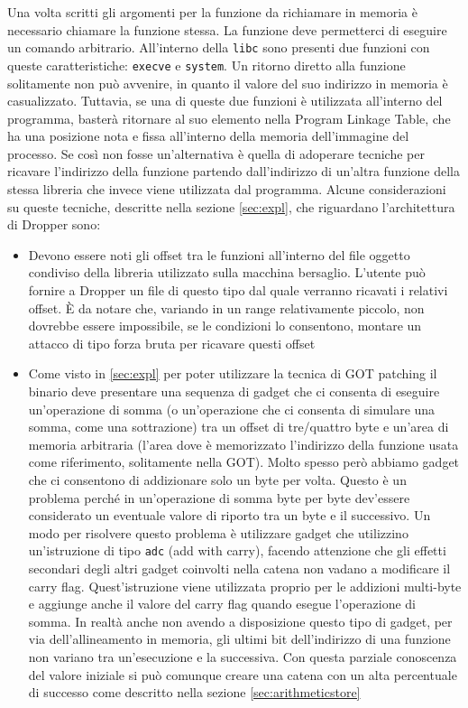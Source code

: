 Una volta scritti gli argomenti per la funzione da richiamare in
memoria è necessario chiamare la funzione stessa. La funzione deve
permetterci di eseguire un comando arbitrario. All'interno della
\lstinline{libc} sono presenti due funzioni con queste
caratteristiche: \lstinline{execve} e \lstinline{system}. Un ritorno
diretto alla funzione solitamente non può avvenire, in quanto il
valore del suo indirizzo in memoria è casualizzato. Tuttavia, se una
di queste due funzioni è utilizzata all'interno del programma, basterà
ritornare al suo elemento nella Program Linkage Table, che ha una
posizione nota e fissa all'interno della memoria dell'immagine del
processo. Se così non fosse un'alternativa è quella di adoperare
tecniche per ricavare l'indirizzo della funzione partendo
dall'indirizzo di un'altra funzione della stessa libreria che invece
viene utilizzata dal programma. Alcune considerazioni su queste
tecniche, descritte nella sezione \ref{sec:expl}, che riguardano
l'architettura di Dropper sono:

\begin{itemize}
  \item Devono essere noti gli offset tra le funzioni all'interno del
    file oggetto condiviso della libreria utilizzato sulla macchina
    bersaglio. L'utente può fornire a Dropper un file di questo tipo
    dal quale verranno ricavati i relativi offset. È da notare che,
    variando in un range relativamente piccolo, non dovrebbe essere
    impossibile, se le condizioni lo consentono, montare un attacco di
    tipo forza bruta per ricavare questi offset

  \item Come visto in \ref{sec:expl} per poter utilizzare la tecnica
    di GOT patching il binario deve presentare una sequenza di gadget
    che ci consenta di eseguire un'operazione di somma (o
    un'operazione che ci consenta di simulare una somma, come una
    sottrazione) tra un offset di tre/quattro byte e un'area di
    memoria arbitraria (l'area dove è memorizzato l'indirizzo della
    funzione usata come riferimento, solitamente nella GOT). Molto
    spesso però abbiamo gadget che ci consentono di addizionare solo
    un byte per volta. Questo è un problema perché in un'operazione di
    somma byte per byte dev'essere considerato un eventuale valore di
    riporto tra un byte e il successivo. Un modo per risolvere questo
    problema è utilizzare gadget che utilizzino un'istruzione di tipo
    \lstinline{adc} (add with carry), facendo attenzione che gli
    effetti secondari degli altri gadget coinvolti nella catena non
    vadano a modificare il carry flag. Quest'istruzione viene
    utilizzata proprio per le addizioni multi-byte e aggiunge anche il
    valore del carry flag quando esegue l'operazione di somma. In
    realtà anche non avendo a disposizione questo tipo di gadget, per
    via dell'allineamento in memoria, gli ultimi bit dell'indirizzo di
    una funzione non variano tra un'esecuzione e la successiva. Con
    questa parziale conoscenza del valore iniziale si può comunque
    creare una catena con un alta percentuale di successo come
    descritto nella sezione \ref{sec:arithmeticstore}
\end{itemize}

